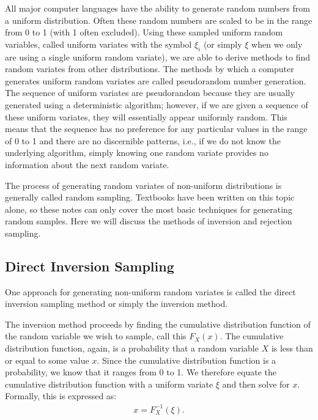 All major computer languages have the ability to generate random numbers from a uniform distribution. Often these random numbers are scaled to be in the range from 0 to 1 (with 1 often excluded). Using these sampled uniform random variables, called uniform variates with the symbol $\xi_i$ (or simply $\xi$ when we only are using a single uniform random variate), we are able to derive methods to find random variates from other distributions. The methods by which a computer generates uniform random variates are called pseudorandom number generation. The sequence of uniform variates are pseudorandom because they are usually generated using a deterministic algorithm; however, if we are given a sequence of these uniform variates, they will essentially appear uniformly random. This means that the sequence has no preference for any particular values in the range of 0 to 1 and there are no discernible patterns, i.e., if we do not know the underlying algorithm, simply knowing one random variate provides no information about the next random variate.

The process of generating random variates of non-uniform distributions is generally called random sampling. Textbooks have been written on this topic alone, so these notes can only cover the most basic techniques for generating random samples. Here we will discuss the methods of inversion and rejection sampling.

\subsection{Direct Inversion Sampling}

One approach for generating non-uniform random variates is called the direct inversion sampling method or simply the inversion method.

The inversion method proceeds by finding the cumulative distribution function of the random variable we wish to sample, call this $F_X(x)$. The cumulative distribution function, again, is a probability that a random variable $X$ is less than or equal to some value $x$. Since the cumulative distribution function is a probability, we know that it ranges from 0 to 1. We therefore equate the cumulative distribution function with a uniform variate $\xi$ and then solve for $x$. Formally, this is expressed as:
\begin{align}
  x = F^{-1}_X(\xi) .
\end{align}


